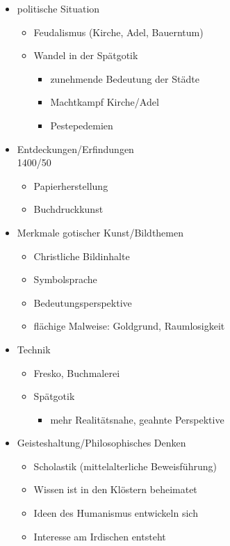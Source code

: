\begin{itemize}
	\item politische Situation
	\begin{itemize}
		\item Feudalismus (Kirche, Adel, Bauerntum)
		\item Wandel in der Spätgotik
		\begin{itemize}
			\item zunehmende Bedeutung der Städte
			\item Machtkampf Kirche/Adel
			\item Pestepedemien
		\end{itemize}
	\end{itemize}
	\item Entdeckungen/Erfindungen\\
	1400/50
	\begin{itemize}
		\item Papierherstellung
		\item Buchdruckkunst
	\end{itemize}
	\item Merkmale gotischer Kunst/Bildthemen
	\begin{itemize}
		\item Christliche Bildinhalte
		\item Symbolsprache
		\item Bedeutungsperspektive
		\item flächige Malweise: Goldgrund, Raumlosigkeit
	\end{itemize}
	\item Technik
	\begin{itemize}
		\item Fresko, Buchmalerei
		\item Spätgotik
		\begin{itemize}
			\item  mehr Realitätsnahe, geahnte Perspektive
		\end{itemize}
	\end{itemize}
	\item Geisteshaltung/Philosophisches Denken
	\begin{itemize}
		\item Scholastik (mittelalterliche Beweisführung)
		\item Wissen ist in den Klöstern beheimatet
		\item Ideen des Humanismus entwickeln sich
		\item Interesse am Irdischen entsteht
	\end{itemize}

\end{itemize}
